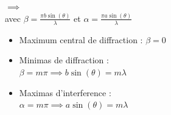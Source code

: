\documentclass[12pt]{book}
\begin{document}
\begin{center}
\begin{minipage}{0.49\linewidth}
                    $\implies$\\
                    avec $\beta = \frac{\pi b \sin(\theta)}{\lambda}$ et $ \alpha = \frac{\pi a \sin(\theta)}{\lambda} $ 
                    \begin{itemize}
                        \item Maximum central de diffraction : $\beta = 0$
                        \item Minimas de diffraction : \\$\beta   =m\pi \implies b\sin(\theta)=m\lambda$
                        \item Maximas d'interference : \\$\alpha = m\pi \implies a\sin(\theta)=m\lambda$
                    \end{itemize}
                \end{minipage}
            \end{center}
        \pagebreak
\end{document}
